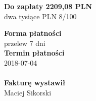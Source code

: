 \documentclass[a4paper,10pt]{article}
\begin{document}
  \noindent
  \begin{flushright}
  \textbf{\LARGE{Do zapłaty} 2209,08 PLN}\\
  dwa tysiące PLN 8/100
  \end{flushright}

  \vfill
  \noindent
  \textbf{Forma płatności}\\
  przelew 7 dni\\
  \textbf{Termin płatności}\\
  2018-07-04\\
  \\
  
  \noindent
    \textbf{Fakturę wystawił}\\
    Maciej Sikorski
    
\end{document}
